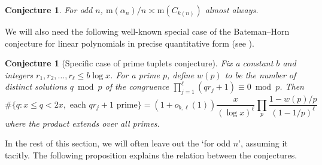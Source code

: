 \documentclass[12pt,reqno]{amsart}
\theoremstyle{definition}
\theoremstyle{plain}
\newtheorem{conjecture}[theorem]{Conjecture}
\theoremstyle{definition}
\newcommand\m{\mathrm{m}}
\renewcommand{\leq}{\leqslant}
\begin{document}
\begin{conjecture}
\label{con:malphan mCk}
For odd $n$, $\m(\alpha_n)/n \asymp \m(C_{k(n)})$ almost always.
\end{conjecture}

We will also need the following well-known special case of the Bateman--Horn conjecture for linear polynomials in precise quantitative form (see \cite[p.~310]{Granville}). 

\begin{conjecture}[Specific case of prime tuplets conjecture]
\label{con:PT_with_error_term}
Fix a constant $b$ and integers $r_1, r_2, \ldots, r_\ell \leq b \log{x}$. For a prime $p$, define $w(p)$ to be the number of distinct solutions $q \bmod{p}$ of the congruence $\prod_{j=1}^\ell (qr_j+1) \equiv 0 \bmod{p}$. 
Then
\begin{equation*}
\# \{q : x \leq q < 2x, \text{ each } q r_j + 1 \text{ prime} \} = (1+o_{b,\ell}(1)) \frac{x}{(\log{x})^\ell} \prod_p \frac{1-w(p)/p}{(1-1/p)^\ell}
\end{equation*}
where the product extends over all primes.
\end{conjecture}

In the rest of this section, we will often leave out the `for odd $n$', assuming it tacitly. The following proposition explains the relation between the conjectures. 
\end{document}
